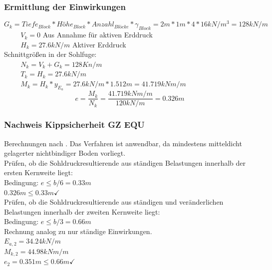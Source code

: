 \documentclass[11pt,fleqn,a4paper]{article}
\begin{document}
\subsubsection{Ermittlung der Einwirkungen}
\begin{equation*}
G_k = Tiefe_{Block} * Höhe_{Block} * Anzahl_{Blöcke} * \gamma_{Block} = 2m * 1m * 4 * 16kN/m^3 = 128kN/m
\end{equation*}
$\hspace{1cm} V_k = 0 $ Aus Annahme für aktiven Erddruck \\
$\hspace{1cm} H_k = 27.6kN/m $ Aktiver Erddruck \\
Schnittgrößen in der Sohlfuge: \\
$\hspace{1cm} N_k = V_k + G_k = 128Kn/m $\\
$\hspace{1cm} T_k = H_k = 27.6kN/m $ \\
$\hspace{1cm} M_k = H_k * y_{E_a} = 27.6kN/m * 1.512m = 41.719kNm/m $ \\
\begin{equation*}
e = \frac{M_k}{N_k} = \frac{41.719kNm/m}{120kN/m} = 0.326m
\end{equation*}
\subsubsection{Nachweis Kippsicherheit GZ EQU}
Berechnungen nach \cite[S.97]{wsp}. Das Verfahren ist anwendbar, da mindestens mitteldicht gelagerter nichtbindiger Boden vorliegt.\\ 
Prüfen, ob die Sohldruckresultierende aus ständigen Belastungen innerhalb der ersten Kernweite liegt: \\
Bedingung: $ e \le b/6 =0.33m$ \\
$ 0.326m \le 0.33m \checkmark$ \\
\newpage
Prüfen, ob die Sohldruckresultierende aus ständigen und veränderlichen Belastungen innerhalb der zweiten Kernweite liegt:\\
Bedingung: $e \le b/3 = 0.66m$\\
Rechnung analog zu nur ständige Einwirkungen.\\
$E_{a,2} = 34.24kN/m$ \\
$M_{k,2} = 44.98kNm/m$ \\
$e_2 = 0.351m \le 0.66m \checkmark$
\end{document}
